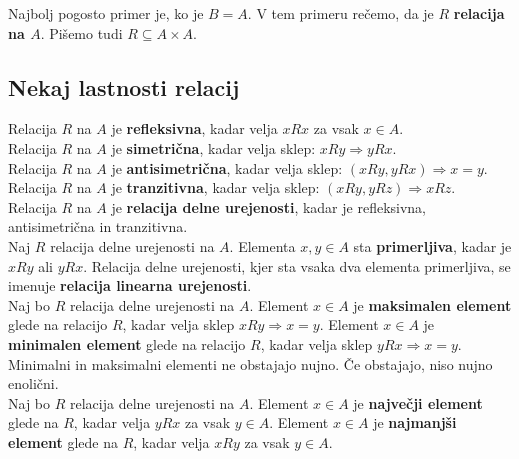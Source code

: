 \documentclass[a4paper,12pt]{article}
\begin{document}
Najbolj pogosto primer je, ko je $B=A$. V tem primeru rečemo, da je $R$ \textbf{relacija na $A$}. Pišemo tudi $R\subseteq A\times A$. \\

\newpage 

\subsection{Nekaj lastnosti relacij}

Relacija $R$ na $A$ je \textbf{refleksivna}, kadar velja $xRx$ za vsak $x\in A$. \\

Relacija $R$ na $A$ je \textbf{simetrična}, kadar velja sklep: $xRy\Rightarrow yRx$. \\

Relacija $R$ na $A$ je \textbf{antisimetrična}, kadar velja sklep: $(xRy,yRx)\Rightarrow x=y$.\\

Relacija $R$ na $A$ je \textbf{tranzitivna}, kadar velja sklep: $(xRy,yRz)\Rightarrow xRz$.\\

Relacija $R$ na $A$ je \textbf{relacija delne urejenosti}, kadar je refleksivna, antisimetrična in \linebreak tranzitivna.\\

Naj $R$ relacija delne urejenosti na $A$. Elementa $x,y\in A$ sta \textbf{primerljiva}, kadar je $xRy$ ali $yRx$. Relacija delne urejenosti, kjer sta vsaka dva elementa primerljiva, se imenuje \textbf{relacija linearna urejenosti}. \\

Naj bo $R$ relacija delne urejenosti na $A$. Element $x\in A$ je \textbf{maksimalen element} glede na relacijo $R$, kadar velja sklep $xRy\Rightarrow x=y$. Element $x\in A$ je \textbf{minimalen element} glede na relacijo $R$, kadar velja sklep $yRx\Rightarrow x=y$. \\

Minimalni in maksimalni elementi ne obstajajo nujno. Če obstajajo, niso nujno enolični. \\

Naj bo $R$ relacija delne urejenosti na $A$. Element $x\in A$ je \textbf{največji element} glede na $R$, kadar velja $yRx$ za vsak $y\in A$. Element $x\in A$ je \textbf{najmanjši element} glede na $R$, kadar velja $xRy$ za vsak $y\in A$. \\
\end{document}
